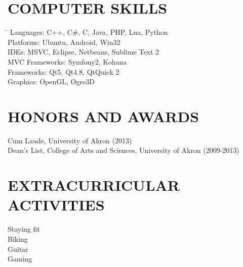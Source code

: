 \documentclass{res}
\begin{document}
\begin{resume}
\section{COMPUTER SKILLS}
  \vspace{-0.1in}
  \begin{tabbing}
  \hspace{2.3in} \= \kill
  Languages: \>  C++, C\#, C, Java, PHP, Lua, Python \\
  Platforms: \> Ubuntu, Android, Win32 \\
  IDEs: \> MSVC, Eclipse, Netbeans, Sublime Text 2 \\
  MVC Frameworks: \> Symfony2, Kohana \\
  Frameworks: \> Qt5, Qt4.8, QtQuick 2 \\
  Graphics: \> OpenGL, Ogre3D
  \end{tabbing}

\section{HONORS AND AWARDS}          
    Cum Laude, University of Akron (2013) \\
    Dean's List, College of Arts and Sciences, University of Akron (2009-2013)         
 
\section{EXTRACURRICULAR ACTIVITIES}          
    Staying fit \\
    Biking \\
    Guitar \\
    Gaming  
 
\end{resume}
\end{document}
